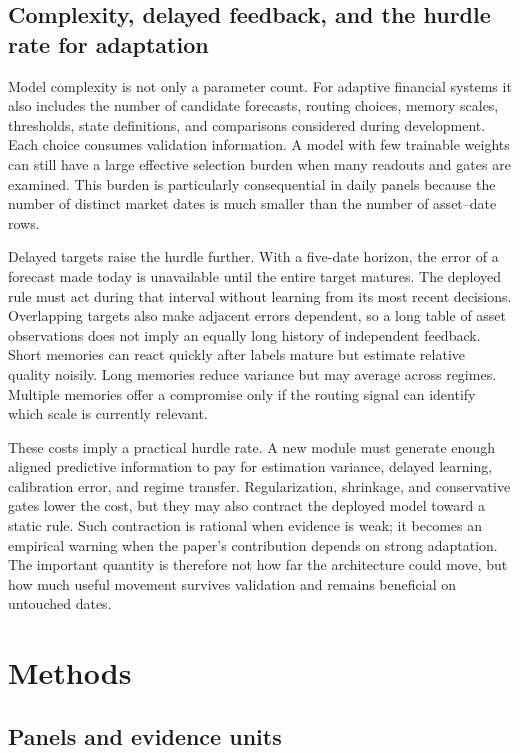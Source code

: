 \documentclass{crebss}
\begin{document}
\subsection{Complexity, delayed feedback, and the hurdle rate for adaptation}

Model complexity is not only a parameter count. For adaptive financial systems it also includes the number of candidate forecasts, routing choices, memory scales, thresholds, state definitions, and comparisons considered during development. Each choice consumes validation information. A model with few trainable weights can still have a large effective selection burden when many readouts and gates are examined. This burden is particularly consequential in daily panels because the number of distinct market dates is much smaller than the number of asset--date rows.

Delayed targets raise the hurdle further. With a five-date horizon, the error of a forecast made today is unavailable until the entire target matures. The deployed rule must act during that interval without learning from its most recent decisions. Overlapping targets also make adjacent errors dependent, so a long table of asset observations does not imply an equally long history of independent feedback. Short memories can react quickly after labels mature but estimate relative quality noisily. Long memories reduce variance but may average across regimes. Multiple memories offer a compromise only if the routing signal can identify which scale is currently relevant.

These costs imply a practical hurdle rate. A new module must generate enough aligned predictive information to pay for estimation variance, delayed learning, calibration error, and regime transfer. Regularization, shrinkage, and conservative gates lower the cost, but they may also contract the deployed model toward a static rule. Such contraction is rational when evidence is weak; it becomes an empirical warning when the paper's contribution depends on strong adaptation. The important quantity is therefore not how far the architecture could move, but how much useful movement survives validation and remains beneficial on untouched dates.

\section{Methods}

\subsection{Panels and evidence units}
\end{document}
